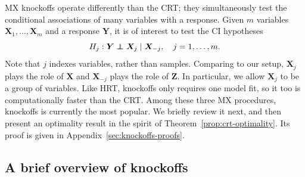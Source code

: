 \documentclass[12pt]{article}
\theoremstyle{definition}
\theoremstyle{remark}
\def\independenT#1#2{\mathrel{\rlap{$#1#2$}\mkern2mu{#1#2}}}
\newcommand\independent{\protect\mathpalette{\protect\independenT}{\perp}}
\newcommand{\prx}{\bm X}
\newcommand{\prz}{\bm Z}
\newcommand{\pry}{{\bm Y}}
\begin{document}
MX knockoffs \cite{CetL16} operate differently than the CRT; they simultaneously test the conditional associations of many variables with a response. Given $m$ variables $\prx_1, \dots, \prx_m$ and a response $\pry$, it is of interest to test the CI hypotheses
\begin{equation*}
H_j: \pry \independent \prx_j \mid \prx_{-j}, \quad j = 1, \dots, m.
\end{equation*}
Note that $j$ indexes variables, rather than samples. Comparing to our setup, $\prx_j$ plays the role of $\prx$ and $\prx_{-j}$ plays the role of $\prz$. In particular, we allow $\prx_j$ to be a group of variables. Like HRT, knockoffs only requires one model fit, so it too is computationally faster than the CRT. Among these three MX procedures, knockoffs is currently the most popular. We briefly review it next, and then present an optimality result in the spirit of Theorem~\ref{prop:crt-optimality}. Its proof is given in Appendix~\ref{sec:knockoffs-proofs}.

\subsection{A brief overview of knockoffs} \label{sec:knockoffs-overview}
\end{document}
